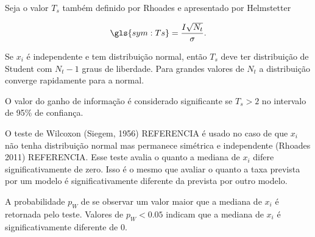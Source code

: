 Seja o valor $T_s$ também definido por Rhoades e apresentado por Helmstetter

\begin{equation}
	\ensuremath{
		\gls{sym:Ts} = \frac{I\sqrt{N_t}}{\sigma}.
	}
	\label{eq:T}
\end{equation}

Se $x_i$ é independente e tem distribuição normal,
então $T_s$ deve ter distribuição de Student com $N_t - 1$ graus de liberdade. Para grandes valores de $N_t$
a distribuição converge rapidamente para a normal.

O valor do ganho de informação é considerado significante se $T_s > 2$ no intervalo de 95\% de confiança.

O teste de Wilcoxon (Siegem, 1956) REFERENCIA é usado no caso de que $x_i$ não tenha distribuição normal
mas permanece simétrica e independente (Rhoades 2011) REFERENCIA.
Esse teste avalia o quanto a mediana de $x_i$ difere significativamente de zero.
Isso é o mesmo que avaliar o quanto a taxa prevista por um modelo é significativamente diferente da prevista por 
outro modelo.

A probabilidade $p_W$ de se observar um valor maior que a mediana de $x_i$ é retornada pelo teste.
Valores de $p_W < 0.05$ indicam que a mediana de $x_i$ é significativamente diferente de 0.


